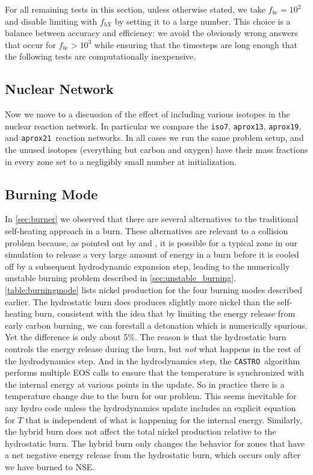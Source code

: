 \documentclass[twocolumn,numberedappendix]{../aastex6}
\newcommand{\castro}{\texttt{CASTRO}}
\newcommand{\isoseven}{\texttt{iso7}}
\newcommand{\aproxthirteen}{\texttt{aprox13}}
\newcommand{\aproxnineteen}{\texttt{aprox19}}
\newcommand{\aproxtwentyone}{\texttt{aprox21}}
\begin{document}

For all remaining tests in this section, unless otherwise stated, we take $f_{be} = 10^2$
and disable limiting with $f_{bX}$ by setting it to a large number. This choice is a balance
between accuracy and efficiency: we avoid the obviously wrong answers that occur for $f_{be} > 10^3$
while ensuring that the timesteps are long enough that the following tests are computationally
inexpensive.



\subsection{Nuclear Network}
\label{sec:parameters:network}

Now we move to a discussion of the effect of including various isotopes
in the nuclear reaction network. In particular we compare the \isoseven, \aproxthirteen,
\aproxnineteen, and \aproxtwentyone\ reaction networks. In all cases we run
the same problem setup, and the unused isotopes (everything but carbon and oxygen)
have their mass fractions in every zone set to a negligibly small number at initialization.



\subsection{Burning Mode}
\label{sec:parameters:burningmode}

In \autoref{sec:burner} we observed that there are several alternatives to the traditional
self-heating approach in a burn. These alternatives are relevant to a collision problem because,
as pointed out by \cite{raskin:2010} and \cite{kushnir:2013}, it is possible for a typical
zone in our simulation to release a very large amount of energy in a burn before it is cooled
off by a subsequent hydrodynamic expansion step, leading to the numerically unstable burning
problem described in \autoref{sec:unstable_burning}. \autoref{table:burningmode} lists nickel
production for the four burning modes described earlier. The hydrostatic burn does produces
slightly more nickel than the self-heating burn, consistent with the idea that by limiting the
energy release from early carbon burning, we can forestall a detonation which is numerically
spurious. Yet the difference is only about 5\%. The reason is that the hydrostatic burn controls
the energy release during the burn, but \textit{not} what happens in the rest of the hydrodynamics
step. And in the hydrodynamics step, the \castro\ algorithm performs multiple EOS calls to ensure
that the temperature is synchronized with the internal energy at various points in the update.
So in practice there is a temperature change due to the burn for our problem. This seems inevitable
for any hydro code unless the hydrodynamics update includes an explicit equation for $T$ that is
independent of what is happening for the internal energy. Similarly, the hybrid burn does not
affect the total nickel production relative to the hydrostatic burn. The hybrid burn only changes
the behavior for zones that have a net negative energy release from the hydrostatic burn, which
occurs only after we have burned to NSE.
\end{document}
